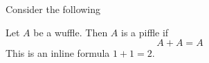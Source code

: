 Consider the following
\begin{theorem}
	Let
	$A$
	be a wuffle.
	Then
	$A$
	is a piffle if
	\begin{equation*}
		A + A = A
	\end{equation*}
	This is an inline formula
	$1+1=2$.
\end{theorem}
